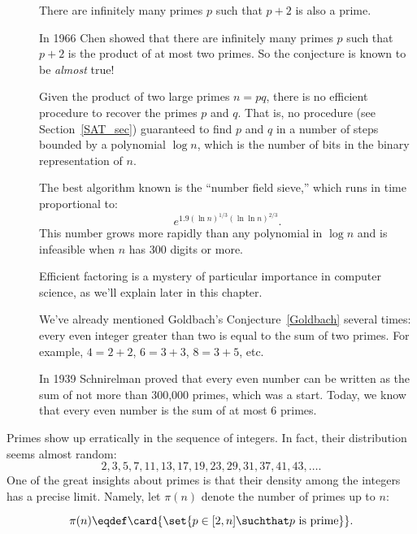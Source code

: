 \begin{description}

\item[] There are infinitely many primes
  $p$ such that $p + 2$ is also a prime.

  In 1966 Chen showed that there are infinitely many primes $p$ such
  that $p + 2$ is the product of at most two primes.  So the
  conjecture is known to be \emph{almost} true!

\item[] Given the product
  of two large primes $n = pq$, there is no efficient procedure to
  recover the primes $p$ and $q$.  That is, no \emph{} procedure (see Section~\ref{SAT_sec}) guaranteed to find
  $p$ and $q$ in a number of steps bounded by a polynomial $\log n$,
  which is the number of bits in the binary representation of $n$.

  The best algorithm known is the ``number field sieve,'' which runs
  in time proportional to:
  \[
  e^{1.9(\ln n)^{1/3} (\ln\ln n)^{2/3}}.
  \]
  This number grows more rapidly than any polynomial in $\log n$ and
  is infeasible when $n$ has 300 digits or more.

  Efficient factoring is a mystery of particular importance in
  computer science, as we'll explain later in this chapter.

\item[] We've already mentioned Goldbach's
  Conjecture~\ref{Goldbach} several times: every even integer greater
  than two is equal to the sum of two primes.  For example, $4 = 2 +
  2$, $6 = 3 + 3$, $8 = 3 + 5$, etc.

  In 1939 Schnirelman proved that every even number can be written as
  the sum of not more than 300,000 primes, which was a start.  Today,
  we know that every even number is the sum of at most 6 primes.
\end{description}

Primes show up erratically in the sequence of integers.  In fact,
their distribution seems almost random:
\[
2, 3, 5, 7, 11, 13, 17, 19, 23, 29, 31, 37, 41, 43, \dots.
\]
One of the great insights about primes is that their density among the
integers has a precise limit.  Namely, let $\pi(n)$ denote the number
of primes up to $n$:

\begin{definition}\label{def:prime<x}
\[
  \pi(n) \eqdef \card{\set{p \in [2, n] \suchthat p \text{ is
        prime}}}.
\]
\end{definition}

